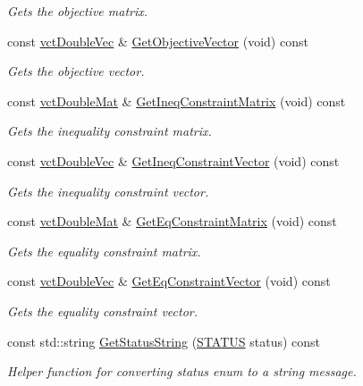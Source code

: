 \begin{DoxyCompactItemize}
\begin{DoxyCompactList}\small\item\em Gets the objective matrix. \end{DoxyCompactList}\item 
const \hyperlink{vct_dynamic_vector_types_8h_ade4b3068c86fb88f41af2e5187e491c2}{vct\-Double\-Vec} \& \hyperlink{classnmr_constraint_optimizer_a835ec60432eb686754959afa2e0dec35}{Get\-Objective\-Vector} (void) const 
\begin{DoxyCompactList}\small\item\em Gets the objective vector. \end{DoxyCompactList}\item 
const \hyperlink{vct_dynamic_matrix_types_8h_a48f1eb2461d20a99e824ee5753a37c84}{vct\-Double\-Mat} \& \hyperlink{classnmr_constraint_optimizer_a732e496cb26a4806c8c0d7d66d65a44f}{Get\-Ineq\-Constraint\-Matrix} (void) const 
\begin{DoxyCompactList}\small\item\em Gets the inequality constraint matrix. \end{DoxyCompactList}\item 
const \hyperlink{vct_dynamic_vector_types_8h_ade4b3068c86fb88f41af2e5187e491c2}{vct\-Double\-Vec} \& \hyperlink{classnmr_constraint_optimizer_a76b519ce61aa79cc2aa84dd4013650d4}{Get\-Ineq\-Constraint\-Vector} (void) const 
\begin{DoxyCompactList}\small\item\em Gets the inequality constraint vector. \end{DoxyCompactList}\item 
const \hyperlink{vct_dynamic_matrix_types_8h_a48f1eb2461d20a99e824ee5753a37c84}{vct\-Double\-Mat} \& \hyperlink{classnmr_constraint_optimizer_a4fbb9e87f37b097e35afbd9d456fe584}{Get\-Eq\-Constraint\-Matrix} (void) const 
\begin{DoxyCompactList}\small\item\em Gets the equality constraint matrix. \end{DoxyCompactList}\item 
const \hyperlink{vct_dynamic_vector_types_8h_ade4b3068c86fb88f41af2e5187e491c2}{vct\-Double\-Vec} \& \hyperlink{classnmr_constraint_optimizer_af6d4834401a9a12904b686660d636fc6}{Get\-Eq\-Constraint\-Vector} (void) const 
\begin{DoxyCompactList}\small\item\em Gets the equality constraint vector. \end{DoxyCompactList}\item 
const std\-::string \hyperlink{classnmr_constraint_optimizer_a99420d0d71c6f00da08ed2f2307b2afb}{Get\-Status\-String} (\hyperlink{classnmr_constraint_optimizer_ad46bf972892431d2c0a43a7099aec898}{S\-T\-A\-T\-U\-S} status) const 
\begin{DoxyCompactList}\small\item\em Helper function for converting status enum to a string message. \end{DoxyCompactList}\end{DoxyCompactItemize}



